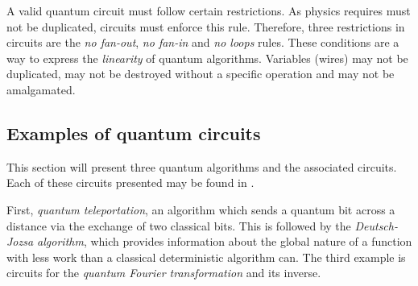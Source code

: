 \begin{table}
  \caption{Syntactic elements of quantum circuit diagrams}\label{tab:qcdSyntax}
\end{table}

A valid quantum circuit must follow certain restrictions. As physics requires \qubits{} must not be
duplicated, circuits must enforce this rule. Therefore, three restrictions in circuits are the
\emph{no fan-out}, \emph{no fan-in} and \emph{no loops} rules. These conditions are a way to
express the \emph{linearity} of quantum algorithms. Variables (wires) may not be duplicated, may
not be destroyed without a specific operation and may not be amalgamated.

\subsection{Examples of quantum circuits} %
\label{sub:examples_of_quantum_circuits}


This section will present three quantum algorithms and the associated circuits. Each of these
circuits presented may be found in \cite{neilsen2000:QuantumComputationAndInfo}.

First, \emph{quantum teleportation}, an algorithm which sends a quantum bit across a distance via
the exchange of two classical bits. This is followed by the \emph{Deutsch-Jozsa algorithm}, which
provides information about the global nature of a function with less work than a classical
deterministic algorithm can. The third example is circuits for the \emph{quantum Fourier
transformation} and its inverse.

